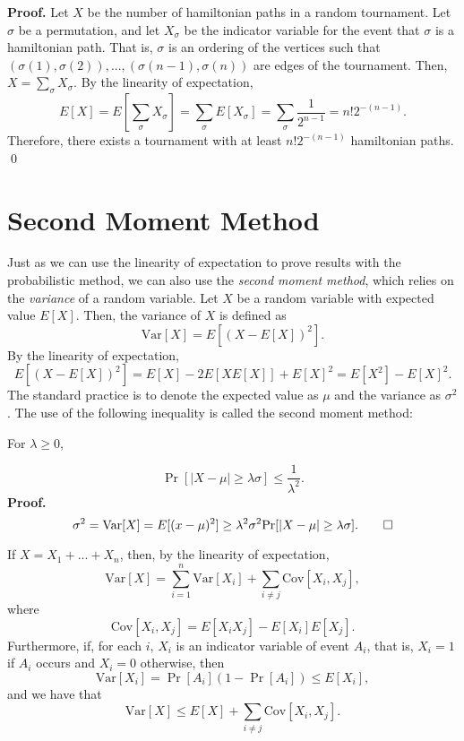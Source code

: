 \textbf{Proof. } Let $X$ be the number of hamiltonian paths in a random tournament. Let $\sigma$ be a permutation, and let $X_\sigma$ be the indicator variable for the event that $\sigma$ is a hamiltonian path. That is, $\sigma$ is an ordering of the vertices such that $(\sigma(1), \sigma(2)), ..., (\sigma(n - 1), \sigma(n))$ are edges of the tournament. Then, $X = \sum_{\sigma} X_\sigma$. By the linearity of expectation,
\[E[X] = E\left[\sum_{\sigma} X_\sigma\right] = \sum_{\sigma} E[X_\sigma] = \sum_{\sigma} \frac{1}{2^{n - 1}} = n!2^{-(n - 1)}.\]
Therefore, there exists a tournament with at least $n!2^{-(n - 1)}$ hamiltonian paths. \qed

\section{Second Moment Method}\label{sec:probmet:secondmoment}

Just as we can use the linearity of expectation to prove results with the probabilistic method, we can also use the \textit{second moment method}, which relies on the \textit{variance} of a random variable. Let $X$ be a random variable with expected value $E[X]$. Then, the variance of $X$ is defined as
\[\text{Var}[X] = E[(X - E[X])^2].\]
By the linearity of expectation, 
\[E[(X - E[X])^2] = E[X] - 2E[XE[X]] + E[X]^2 = E[X^2] - E[X]^2.\]
The standard practice is to denote the expected value as $\mu$ and the variance as $\sigma^2$. The use of the following inequality is called the second moment method: \par

\begin{theorem}\label{thm:probmet:chebyschev}\cite{alon2016probabilistic}
    For $\lambda \geq 0$,
\end{theorem}
\[\Pr[|X - \mu| \geq \lambda \sigma] \leq \frac{1}{\lambda^2}.\]
\textbf{Proof. } 
\[\sigma^2 = \text{Var}[X] = E[(x - \mu)^2] \geq \lambda^2\sigma^2 \Pr[|X - \mu| \geq \lambda \sigma]. \qed\]

If $X = X_1 + ... + X_n$, then, by the linearity of expectation,
\[\text{Var}[X] = \sum_{i = 1}^{n}\text{Var}[X_i] + \sum_{i \neq j}\text{Cov}[X_i, X_j],\]
where 
\[\text{Cov}[X_i, X_j] = E[X_iX_j] - E[X_i]E[X_j].\] 
Furthermore, if, for each $i$, $X_i$ is an indicator variable of event $A_i$, that is, $X_i = 1$ if $A_i$ occurs and $X_i = 0$ otherwise, then
\[\text{Var}[X_i] = \Pr[A_i](1 - \Pr[A_i]) \leq E[X_i],\]
and we have that
\[\text{Var}[X] \leq E[X] + \sum_{i \neq j} \text{Cov}[X_i, X_j].\]

